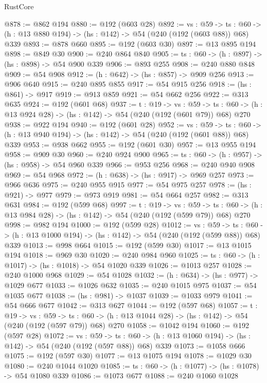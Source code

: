 \begin{lexlean}{RustCore}
\begin{coremodule}
@878 := @862 @194
@880 := @192 (@603 @28)
@892 := {vs : @59} ->
  {ts : @60} -> (h : @13 @880 @194) -> (hs : @142) -> @54 (@240 (@192 (@603 @88)) @68) @339
@893 := @878 @660
@895 := @192 (@603 @30)
@897 := @13 @895 @194
@898 := @849 @30
@900 := @240 @864 @840
@905 := {ts : @60} -> (h : @897) -> (hs : @898) -> @54 @900 @339
@906 := @893 @255
@908 := @240 @880 @848
@909 := @54 @908
@912 := (h : @642) -> (hs : @857) -> @909 @256
@913 := @906 @640
@915 := @240 @895 @855
@917 := @54 @915 @256
@918 := (hs : @861) -> @917
@919 := @913 @859
@921 := @54 @662 @256
@922 := @313 @635
@924 := @192 (@601 @68)
@937 := {t : @19} ->
  {vs : @59} ->
  {ts : @60} -> (h : @13 @924 @28) -> (hs : @142) -> @54 (@240 (@192 (@601 @79)) @68) @270
@938 := @922 @194
@940 := @192 (@601 @28)
@952 := {vs : @59} ->
  {ts : @60} -> (h : @13 @940 @194) -> (hs : @142) -> @54 (@240 (@192 (@601 @88)) @68) @339
@953 := @938 @662
@955 := @192 (@601 @30)
@957 := @13 @955 @194
@958 := @909 @30
@960 := @240 @924 @900
@965 := {ts : @60} -> (h : @957) -> (hs : @958) -> @54 @960 @339
@966 := @953 @256
@968 := @240 @940 @908
@969 := @54 @968
@972 := (h : @638) -> (hs : @917) -> @969 @257
@973 := @966 @636
@975 := @240 @955 @915
@977 := @54 @975 @257
@978 := (hs : @921) -> @977
@979 := @973 @919
@981 := @54 @664 @257
@982 := @313 @631
@984 := @192 (@599 @68)
@997 := {t : @19} ->
  {vs : @59} ->
  {ts : @60} -> (h : @13 @984 @28) -> (hs : @142) -> @54 (@240 (@192 (@599 @79)) @68) @270
@998 := @982 @194
@1000 := @192 (@599 @28)
@1012 := {vs : @59} ->
  {ts : @60} -> (h : @13 @1000 @194) -> (hs : @142) -> @54 (@240 (@192 (@599 @88)) @68) @339
@1013 := @998 @664
@1015 := @192 (@599 @30)
@1017 := @13 @1015 @194
@1018 := @969 @30
@1020 := @240 @984 @960
@1025 := {ts : @60} -> (h : @1017) -> (hs : @1018) -> @54 @1020 @339
@1026 := @1013 @257
@1028 := @240 @1000 @968
@1029 := @54 @1028
@1032 := (h : @634) -> (hs : @977) -> @1029 @677
@1033 := @1026 @632
@1035 := @240 @1015 @975
@1037 := @54 @1035 @677
@1038 := (hs : @981) -> @1037
@1039 := @1033 @979
@1041 := @54 @666 @677
@1042 := @313 @627
@1044 := @192 (@597 @68)
@1057 := {t : @19} ->
  {vs : @59} ->
  {ts : @60} -> (h : @13 @1044 @28) -> (hs : @142) -> @54 (@240 (@192 (@597 @79)) @68) @270
@1058 := @1042 @194
@1060 := @192 (@597 @28)
@1072 := {vs : @59} ->
  {ts : @60} -> (h : @13 @1060 @194) -> (hs : @142) -> @54 (@240 (@192 (@597 @88)) @68) @339
@1073 := @1058 @666
@1075 := @192 (@597 @30)
@1077 := @13 @1075 @194
@1078 := @1029 @30
@1080 := @240 @1044 @1020
@1085 := {ts : @60} -> (h : @1077) -> (hs : @1078) -> @54 @1080 @339
@1086 := @1073 @677
@1088 := @240 @1060 @1028

\end{coremodule}
\end{lexlean}
